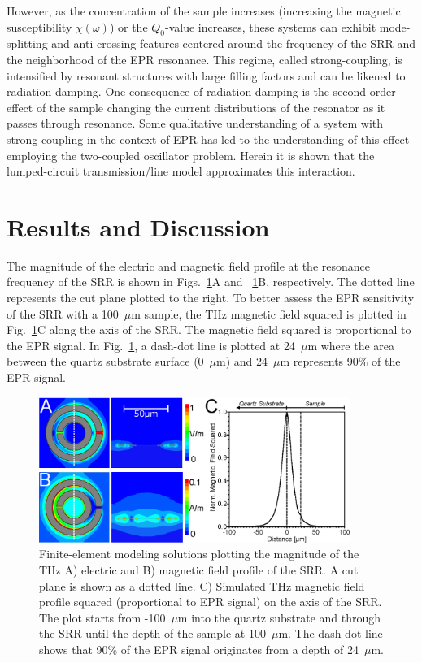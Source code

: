 However, as the concentration of the sample increases (increasing the magnetic susceptibility $\chi(\omega)$) or the $Q_0$-value increases, these systems can exhibit mode-splitting and anti-crossing features centered around the frequency of the SRR and the neighborhood of the EPR resonance. This regime, called strong-coupling, is intensified by resonant structures with large filling factors and can be likened to radiation damping. \cite{BloembergenRadDamp, BloomRadDamp, MeiboomRadDamp} One consequence of radiation damping is the second-order effect of the sample changing the current distributions of the resonator as it passes through resonance. Some qualitative understanding of a system with strong-coupling in the context of EPR has led to the understanding of this effect employing the two-coupled oscillator problem. \cite{SchneiderEPR,BOERO2013133,Scalari1323} Herein it is shown that the lumped-circuit transmission\-/line model approximates this interaction. 

\section{Results and Discussion}
The magnitude of the electric and magnetic field profile at the resonance frequency of the SRR is shown in Figs.~\ref{ch3-fig:HFSS}A and ~\ref{ch3-fig:HFSS}B, respectively. The dotted line represents the cut plane plotted to the right. To better assess the EPR sensitivity of the SRR with a 100~$\mu$m sample, the THz magnetic field squared is plotted in Fig.~\ref{ch3-fig:HFSS}C along the axis of the SRR. The magnetic field squared is proportional to the EPR signal. In Fig.~\ref{ch3-fig:HFSS}, a dash-dot line is plotted at 24~$\mu$m where the area between the quartz substrate surface (0~$\mu$m) and 24~$\mu$m represents 90\% of the EPR signal.

\begin{figure}[htp]
\centering
  \includegraphics[width=0.9\textwidth]{Kapitel/Ch3-Images/02-AnsoftFields.eps}%
  \caption[Finite-element simulation solutions of SRR geometry.]{Finite-element modeling solutions plotting the magnitude of the THz A) electric and B) magnetic field profile of the SRR. A cut plane is shown as a dotted line. C) Simulated THz magnetic field profile squared (proportional to EPR signal) on the axis of the SRR. The plot starts from -100~$\mu$m into the quartz substrate and through the SRR until the depth of the sample at 100~$\mu$m. The dash-dot line shows that 90\% of the EPR signal originates from a depth of 24~$\mu$m.}
  \label{ch3-fig:HFSS}
\end{figure}


